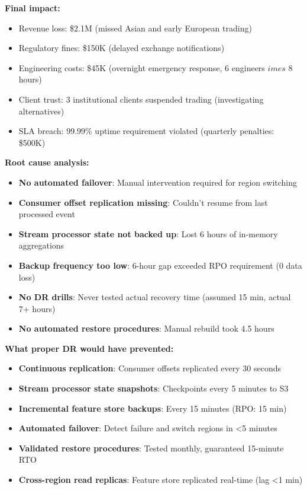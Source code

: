 \textbf{Final impact:}
\begin{itemize}
    \item Revenue loss: \$2.1M (missed Asian and early European trading)
    \item Regulatory fines: \$150K (delayed exchange notifications)
    \item Engineering costs: \$45K (overnight emergency response, 6 engineers $	imes$ 8 hours)
    \item Client trust: 3 institutional clients suspended trading (investigating alternatives)
    \item SLA breach: 99.99\% uptime requirement violated (quarterly penalties: \$500K)
\end{itemize}

\textbf{Root cause analysis:}
\begin{itemize}
    \item \textbf{No automated failover}: Manual intervention required for region switching
    \item \textbf{Consumer offset replication missing}: Couldn't resume from last processed event
    \item \textbf{Stream processor state not backed up}: Lost 6 hours of in-memory aggregations
    \item \textbf{Backup frequency too low}: 6-hour gap exceeded RPO requirement (0 data loss)
    \item \textbf{No DR drills}: Never tested actual recovery time (assumed 15 min, actual 7+ hours)
    \item \textbf{No automated restore procedures}: Manual rebuild took 4.5 hours
\end{itemize}

\textbf{What proper DR would have prevented:}
\begin{itemize}
    \item \textbf{Continuous replication}: Consumer offsets replicated every 30 seconds
    \item \textbf{Stream processor state snapshots}: Checkpoints every 5 minutes to S3
    \item \textbf{Incremental feature store backups}: Every 15 minutes (RPO: 15 min)
    \item \textbf{Automated failover}: Detect failure and switch regions in <5 minutes
    \item \textbf{Validated restore procedures}: Tested monthly, guaranteed 15-minute RTO
    \item \textbf{Cross-region read replicas}: Feature store replicated real-time (lag <1 min)
\end{itemize}

